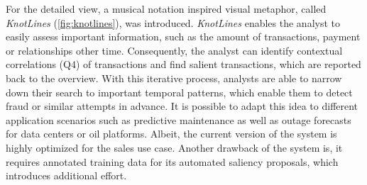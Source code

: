 \documentclass[electronic]{vgtc}             %
\begin{document}
For the detailed view, a musical notation inspired visual metaphor, called \textit{KnotLines}  (\autoref{fig:knotlines}), was introduced.
\textit{KnotLines}  enables the analyst to easily assess important information, such as the amount of transactions, payment or relationships other time. 
Consequently, the analyst can identify contextual correlations (Q4) of transactions and find salient transactions, which are reported back to the overview. 
With this iterative process, analysts are able to narrow down their search to important temporal patterns, which enable them to detect fraud or similar attempts in advance. 
It is possible to adapt this idea to different application scenarios such as predictive maintenance as well as outage forecasts for data centers or oil platforms.
Albeit, the current version of the system is highly optimized for the sales use case. 
Another drawback of the system is, it requires annotated training data for its automated saliency proposals, which introduces additional effort.
\end{document}
